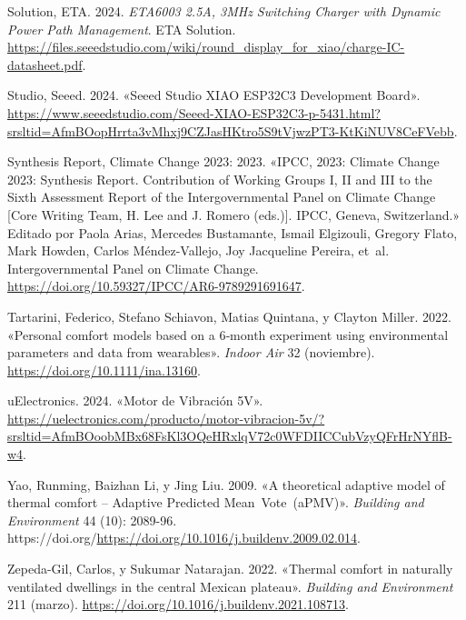 \documentclass[
  12pt,
  letterpaper,
  DIV=11,
  numbers=noendperiod]{scrreport}
\newlength{\cslhangindent}
\newlength{\cslentryspacingunit} %
\newenvironment{CSLReferences}[2] %
 {%
  \setlength{\parindent}{0pt}
  \ifodd #1
  \let\oldpar\par
  \def\par{\hangindent=\cslhangindent\oldpar}
  \fi
  \setlength{\parskip}{#2\cslentryspacingunit}
 }%
 {}
\begin{document}
\begin{CSLReferences}{1}{0}
\leavevmode{}%
Solution, ETA. 2024. \emph{ETA6003 2.5A, 3MHz Switching Charger with
Dynamic Power Path Management}. ETA Solution.
\url{https://files.seeedstudio.com/wiki/round_display_for_xiao/charge-IC-datasheet.pdf}.

\leavevmode{}%
Studio, Seeed. 2024. {«Seeed Studio XIAO ESP32C3 Development Board»}.
\url{https://www.seeedstudio.com/Seeed-XIAO-ESP32C3-p-5431.html?srsltid=AfmBOopHrrta3vMhxj9CZJasHKtro5S9tVjwzPT3-KtKiNUV8CeFVebb}.

\leavevmode{}%
Synthesis Report, Climate Change 2023: 2023. {«IPCC, 2023: Climate
Change 2023: Synthesis Report. Contribution of Working Groups I, II and
III to the Sixth Assessment Report of the Intergovernmental Panel on
Climate Change {[}Core Writing Team, H. Lee and J. Romero (eds.){]}.
IPCC, Geneva, Switzerland.»} Editado por Paola Arias, Mercedes
Bustamante, Ismail Elgizouli, Gregory Flato, Mark Howden, Carlos
Méndez-Vallejo, Joy Jacqueline Pereira, et~al. Intergovernmental Panel
on Climate Change.
\url{https://doi.org/10.59327/IPCC/AR6-9789291691647}.

\leavevmode{}%
Tartarini, Federico, Stefano Schiavon, Matias Quintana, y Clayton
Miller. 2022. {«Personal comfort models based on a 6‐month experiment
using environmental parameters and data from wearables»}. \emph{Indoor
Air} 32 (noviembre). \url{https://doi.org/10.1111/ina.13160}.

\leavevmode{}%
uElectronics. 2024. {«Motor de Vibración 5V»}.
\url{https://uelectronics.com/producto/motor-vibracion-5v/?srsltid=AfmBOoobMBx68FsKl3OQeHRxlqV72c0WFDIICCubVzyQFrHrNYflB-w4}.

\leavevmode{}%
Yao, Runming, Baizhan Li, y Jing Liu. 2009. {«A theoretical adaptive
model of thermal comfort -- Adaptive Predicted Mean~Vote~(aPMV)»}.
\emph{Building and Environment} 44 (10): 2089-96.
https://doi.org/\url{https://doi.org/10.1016/j.buildenv.2009.02.014}.

\leavevmode{}%
Zepeda-Gil, Carlos, y Sukumar Natarajan. 2022. {«Thermal comfort in
naturally ventilated dwellings in the central Mexican plateau»}.
\emph{Building and Environment} 211 (marzo).
\url{https://doi.org/10.1016/j.buildenv.2021.108713}.

\end{CSLReferences}
\end{document}
